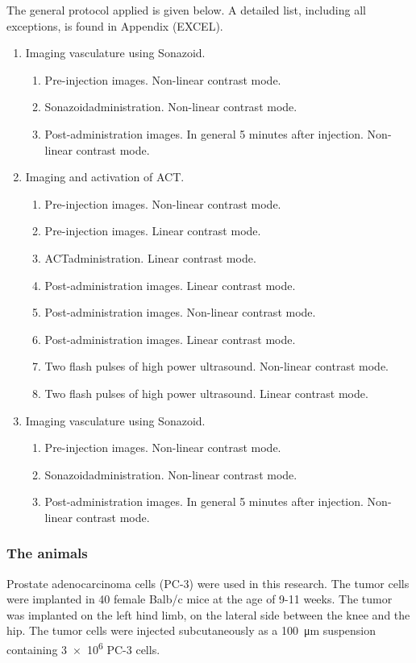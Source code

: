 The general protocol applied is given below\cite{Healey2014}. A detailed list, including all exceptions, is found in Appendix (EXCEL).

\begin{enumerate}
	\item Imaging vasculature using Sonazoid\texttrademark.
		\begin{enumerate}
		\item Pre-injection images. Non-linear contrast mode.
		\item Sonazoid\texttrademark administration. Non-linear contrast mode.
		\item Post-administration images. In general 5 minutes after injection. Non-linear contrast mode.
		\end{enumerate}
	\item Imaging and activation of ACT\textregistered.
		\begin{enumerate}
		\item Pre-injection images. Non-linear contrast mode.
		\item Pre-injection images. Linear contrast mode.
		\item ACT\textregistered administration. Linear contrast mode.
		\item Post-administration images. Linear contrast mode.
		\item Post-administration images. Non-linear contrast mode.
		\item Post-administration images. Linear contrast mode.
		\item Two flash pulses of high power ultrasound. Non-linear contrast mode.
		\item Two flash pulses of high power ultrasound. Linear contrast mode.
		\end{enumerate}
	\item Imaging vasculature using Sonazoid\texttrademark.
		\begin{enumerate}
		\item Pre-injection images. Non-linear contrast mode.
		\item Sonazoid\texttrademark administration. Non-linear contrast mode.
		\item Post-administration images. In general 5 minutes after injection. Non-linear contrast mode.
		\end{enumerate}
\end{enumerate}  
 

\subsubsection{The animals}
Prostate adenocarcinoma cells (PC-3) were used in this research. The tumor cells were implanted in 40 female Balb/c mice at the age of 9-11 weeks. The tumor was implanted on the left hind limb, on the lateral side between the knee and the hip. The tumor cells were injected subcutaneously as a \SI{100}{\micro\meter} suspension containing \num{3e6} PC-3 cells.

